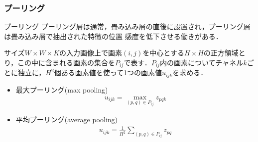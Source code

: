 \documentclass[dvipdfmx,11pt,notheorems]{beamer}
\theoremstyle{definition}
\begin{document}


\begin{frame}[fragile]\frametitle{プーリング}
\begin{block}{プーリング}
プーリング層は通常，畳み込み層の直後に設置され，プーリング層は畳み込み層で抽出された特徴の位置
感度を低下させる働きがある．
\end{block}
サイズ$W \times W \times K$の入力画像上で画素$(i,j)$を中心とする$H\times H$の正方領域とり，この中に含まれる画素の集合を$P_{ij}$で表す．$P_{ij}$内の画素についてチャネル$k$ごとに独立に，$H^2$個ある画素値を使って1つの画素値$u_{ijk}$を求める．

\begin{itemize}
 \item 最大プーリング(max pooling)
	   \begin{eqnarray}
		u_{ijk} = \max_{(p,q) \in P_{ij}} z_{pqk}
	   \end{eqnarray}
 \item 平均プーリング(average pooling)
	   \begin{eqnarray}
		u_{ijk} = \frac{1}{H^{2}}\sum_{(p,q) \in P_{ij}} z_{pq}
	   \end{eqnarray}

\end{itemize}

\end{frame}
\end{document}
